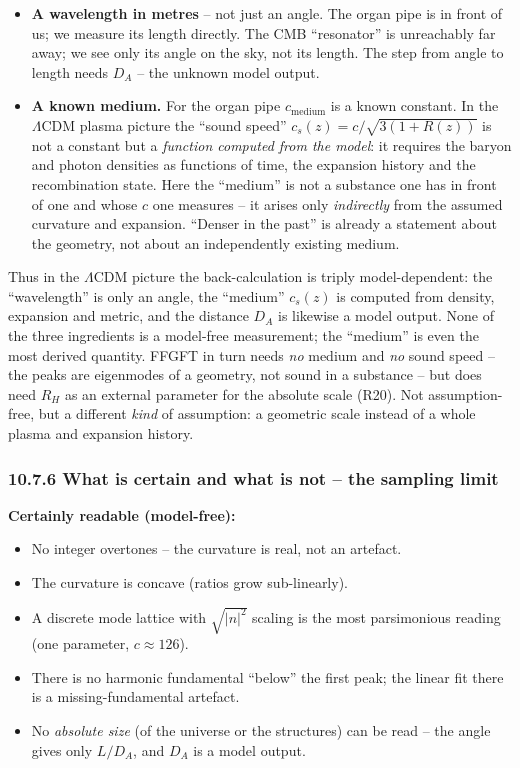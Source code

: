 \begin{itemize}
  \item \textbf{A wavelength in metres} -- not just an angle. The organ
        pipe is in front of us; we measure its length directly. The
        CMB ``resonator'' is unreachably far away; we see only its
        angle on the sky, not its length. The step from angle to length
        needs $D_A$ -- the unknown model output.
  \item \textbf{A known medium.} For the organ pipe $c_\mathrm{medium}$
        is a known constant. In the $\Lambda$CDM plasma picture the
        ``sound speed'' $c_s(z) = c/\sqrt{3(1+R(z))}$ is not a constant
        but a \emph{function computed from the model}: it requires the
        baryon and photon densities as functions of time, the expansion
        history and the recombination state. Here the ``medium'' is not
        a substance one has in front of one and whose $c$ one measures
        -- it arises only \emph{indirectly} from the assumed curvature
        and expansion. ``Denser in the past'' is already a statement
        about the geometry, not about an independently existing medium.
\end{itemize}

Thus in the $\Lambda$CDM picture the back-calculation is triply
model-dependent: the ``wavelength'' is only an angle, the ``medium''
$c_s(z)$ is computed from density, expansion and metric, and the
distance $D_A$ is likewise a model output. None of the three
ingredients is a model-free measurement; the ``medium'' is even the
most derived quantity. FFGFT in turn needs \emph{no} medium and
\emph{no} sound speed -- the peaks are eigenmodes of a geometry, not
sound in a substance -- but does need $R_H$ as an external parameter
for the absolute scale (R20). Not assumption-free, but a different
\emph{kind} of assumption: a geometric scale instead of a whole plasma
and expansion history.

\subsubsection*{10.7.6 What is certain and what is not -- the sampling limit}

\textbf{Certainly readable (model-free):}
\begin{itemize}
  \item No integer overtones -- the curvature is real, not an artefact.
  \item The curvature is concave (ratios grow sub-linearly).
  \item A discrete mode lattice with $\sqrt{|n|^2}$ scaling is the
        most parsimonious reading (one parameter, $c \approx 126$).
  \item There is no harmonic fundamental ``below'' the first peak;
        the linear fit there is a missing-fundamental artefact.
  \item No \emph{absolute size} (of the universe or the structures)
        can be read -- the angle gives only $L/D_A$, and $D_A$ is a
        model output.
\end{itemize}

